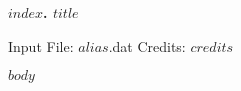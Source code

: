\newcommand{\IO}{
	
	\subsection{Sample Input}
	
	
	
	\subsection{Sample Output}
	
	
	
}
\begin{center}
	\begin{Large}
		\textbf{$index$. $title$}
	\end{Large}
	
	\hspace{\fill}
	Input File: $alias$.dat
	\hspace{\fill}
	Credits: $credits$
	\hspace{\fill}
	
\end{center}
$body$
